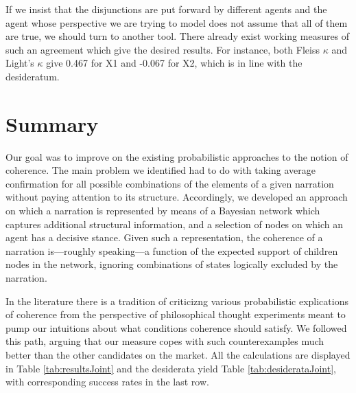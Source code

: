 \documentclass[
  10pt,
]{scrartcl}
\newcommand{\s}[1]{\textsf{#1}}
\begin{document}
If we insist that the disjunctions are put forward by different agents and the agent whose perspective we are trying to model does not assume that all of them are true, we should turn to another tool. There already exist working measures of such an agreement which give the desired results. For instance, both Fleiss \(\kappa\) and Light's \(\kappa\) give 0.467 for \s{X1} and -0.067 for \s{X2}, which is in line with the desideratum.

\hypertarget{summary}{%
\section{\texorpdfstring{Summary \label{sec:discussion}}{Summary }}\label{summary}}

Our goal was to improve on the existing probabilistic approaches to the notion of coherence. The main problem we identified had to do with taking average confirmation for all possible combinations of the elements of a given narration without paying attention to its structure. Accordingly, we developed an approach on which a narration is represented by means of a Bayesian network which captures additional structural information, and a selection of nodes on which an agent has a decisive stance. Given such a representation, the coherence of a narration is---roughly speaking---a function of the expected support of children nodes in the network, ignoring combinations of states logically excluded by the narration.

In the literature there is a tradition of criticizng various probabilistic explications of coherence from the perspective of philosophical thought experiments meant to pump our intuitions about what conditions coherence should satisfy. We followed this path, arguing that our measure copes with such counterexamples much better than the other candidates on the market. All the calculations are displayed in Table \ref{tab:resultsJoint} and the desiderata yield Table \ref{tab:desiderataJoint}, with corresponding success rates in the last row.
\end{document}
